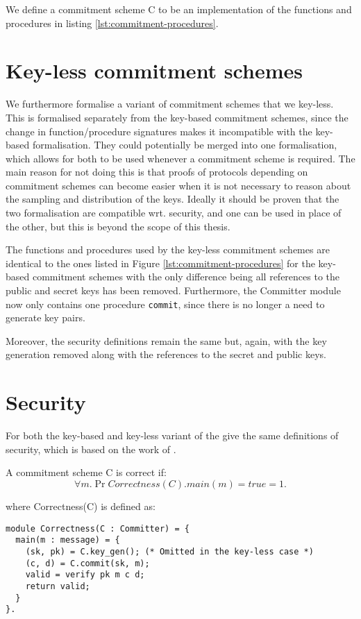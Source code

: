 We define a commitment scheme C to be an implementation of the functions and
procedures in listing \ref{lst:commitment-procedures}.

\section{Key-less commitment schemes}
\label{sec:commitment:key-less}
We furthermore formalise a variant of commitment schemes that we key-less. This
is formalised separately from the key-based commitment schemes, since the
change in function/procedure signatures makes it incompatible with the key-based
formalisation. They could potentially be merged into one formalisation, which
allows for both to be used whenever a commitment scheme is required. The main
reason for not doing this is that proofs of protocols depending on commitment
schemes can become easier when it is not necessary to reason about the sampling
and distribution of the keys. Ideally it should be
proven that the two formalisation are compatible wrt. security, and one can be
used in place of the other, but this is beyond the scope of this thesis.

The functions and procedures used by the key-less commitment schemes are
identical to the ones listed in Figure \ref{lst:commitment-procedures} for the
key-based commitment schemes with the only difference being all references to
the public and secret keys has been removed. Furthermore, the Committer module
now only contains one procedure \texttt{commit}, since there is no longer a need
to generate key pairs.

Moreover, the security definitions remain the same but, again, with the key
generation removed along with the references to the secret and public keys.

\section{Security}
\label{sec:commitment:sec}
For both the key-based and key-less variant of the give the same definitions of security, which is based on the work of \citet{DBLP:journals/corr/MetereD17}.

\begin{definition}[Correctness]
  \label{def:commitment:correctness}
  A commitment scheme C is correct if:
  \[
    \forall m. \Pr{ Correctness(C).main(m) = true } = 1.
  \]

  where Correctness(C) is defined as:

\begin{lstlisting}
module Correctness(C : Committer) = {
  main(m : message) = {
    (sk, pk) = C.key_gen(); (* Omitted in the key-less case *)
    (c, d) = C.commit(sk, m);
    valid = verify pk m c d;
    return valid;
  }
}.
\end{lstlisting}


\end{definition}

